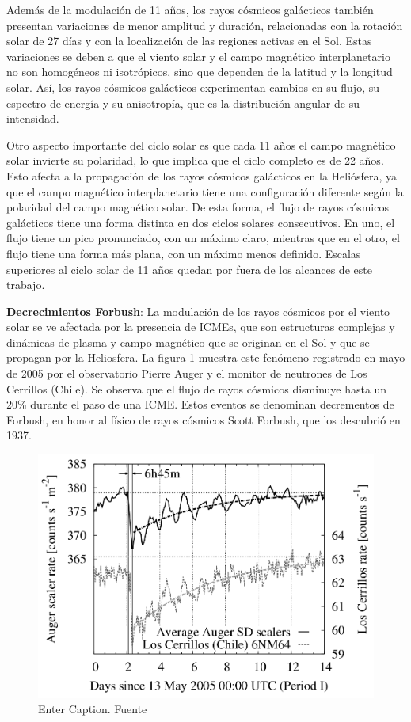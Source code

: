 Además de la modulación de 11 años, los rayos cósmicos galácticos también presentan variaciones de menor amplitud y duración, relacionadas con la rotación solar de 27 días y con la localización de las regiones activas en el Sol. Estas variaciones se deben a que el viento solar y el campo magnético interplanetario no son homogéneos ni isotrópicos, sino que dependen de la latitud y la longitud solar. Así, los rayos cósmicos galácticos experimentan cambios en su flujo, su espectro de energía y su anisotropía, que es la distribución angular de su intensidad.

Otro aspecto importante del ciclo solar es que cada 11 años el campo magnético solar invierte su polaridad, lo que implica que el ciclo completo es de 22 años. Esto afecta a la propagación de los rayos cósmicos galácticos en la Heliósfera, ya que el campo magnético interplanetario tiene una configuración diferente según la polaridad del campo magnético solar. De esta forma, el flujo de rayos cósmicos galácticos tiene una forma distinta en dos ciclos solares consecutivos. En uno, el flujo tiene un pico pronunciado, con un máximo claro, mientras que en el otro, el flujo tiene una forma más plana, con un máximo menos definido. Escalas superiores al ciclo solar de 11 años quedan por fuera de los alcances de este trabajo.

\textbf{Decrecimientos Forbush}:  La modulación de los rayos cósmicos por el viento solar se ve afectada por la presencia de ICMEs, que son estructuras complejas y dinámicas de plasma y campo magnético que se originan en el Sol y que se propagan por la Heliosfera. La figura \ref{forbush}  muestra este fenómeno  registrado en mayo de 2005 por el observatorio Pierre Auger y el monitor de neutrones de Los Cerrillos (Chile).  Se observa que el flujo de rayos cósmicos disminuye hasta un 20\% durante el paso de una ICME. Estos eventos se denominan decrementos de Forbush, en honor al físico de rayos cósmicos Scott Forbush, que los descubrió en 1937.

\begin{figure}[H]
    \centering
    \includegraphics[width=0.6\linewidth]{Figs/mauro_forbush.png}
    \caption{Enter Caption. Fuente \cite{asorey}}
    \label{forbush}
\end{figure}

